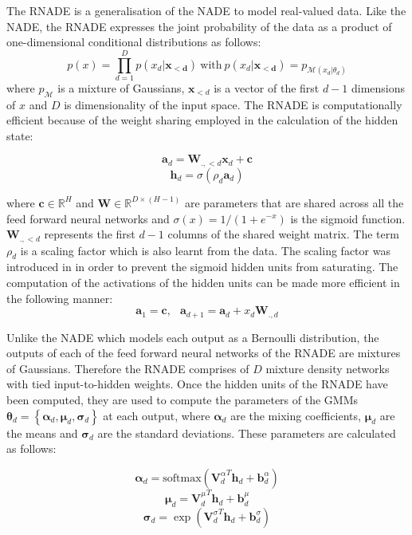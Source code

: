 \documentclass{article} %
\begin{document}
The RNADE is a generalisation of the NADE to model real-valued data. Like the NADE, the RNADE expresses the joint probability of the data as a product of one-dimensional conditional distributions as follows:
$$ p(x) = \prod_{d=1}^{D} p(x_d|\mathbf{x_{<d}}) \: \text{with} \: p(x_d|\mathbf{x_{<d}}) = p_{\mathcal{M}(x_d|\theta_d)} $$ where $p_{\mathcal{M}}$ is a mixture of Gaussians, $\boldsymbol{x}_{<d}$ is a vector of the first $d-1$ dimensions of $x$ and $D$ is dimensionality of the input space. The RNADE is computationally efficient because of the weight sharing employed in the calculation of the hidden state: 

$$ \mathbf{a}_d = \boldsymbol{W}_{.,<d}\boldsymbol{x}_d + \mathbf{c}$$
$$ \boldsymbol{h}_d = \sigma (\rho_d \mathbf{a}_d)$$


where $\mathbf{c} \in \mathbb{R}^{H}$ and $\boldsymbol{W} \in \mathbb{R}^{D \times (H-1)}$ are parameters that are shared across all the feed forward neural networks and $\sigma(x) = 1/(1+e^{-x})$ is the sigmoid function. $\boldsymbol{W}_{.,<d}$ represents the first $d-1$ columns of the shared weight matrix. The term $\rho_d$ is a scaling factor which is also learnt from the data. The scaling factor was introduced in \cite{AISTATS2011_Bengio11} in order to prevent the sigmoid hidden units from saturating. The computation of the activations of the hidden units can be made more efficient in the following manner:
$$ \mathbf{a}_1 = \mathbf{c}, \: \: \; \mathbf{a}_{d+1} = \mathbf{a}_{d} + x_d \mathbf{W}_{.,d}$$

 Unlike the NADE which models each output as a Bernoulli distribution, the outputs of each of the feed forward neural networks of the RNADE are mixtures of Gaussians. Therefore the RNADE comprises of $D$ mixture density networks with tied input-to-hidden weights. Once the hidden units of the RNADE have been computed, they are used to compute the parameters of the GMMs $\boldsymbol{\theta}_d  = \left\{ \boldsymbol{\alpha}_d, \boldsymbol{\mu}_d, \boldsymbol{\sigma}_d \right\}$ at each output, where $\boldsymbol{\alpha}_d$ are the mixing coefficients, $\boldsymbol{\mu}_d$ are the means and $\boldsymbol{\sigma}_d$ are the standard deviations. These parameters are calculated as follows:

$$ \boldsymbol{\alpha}_d = \text{softmax} ({\mathbf{V}_{d}^{\alpha}}^T \mathbf{h}_d + \mathbf{b}^{\alpha}_{d})$$
$$ \boldsymbol{\mu}_d = {\mathbf{V}_{d}^{\mu}}^T \mathbf{h}_d + \mathbf{b}^{\mu}_{d}$$
$$ \boldsymbol{\sigma}_d = \exp ({\mathbf{V}_{d}^{\sigma}}^T \mathbf{h}_d + \mathbf{b}^{\sigma}_{d})$$
\end{document}
